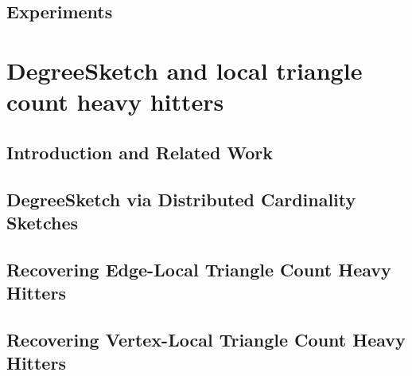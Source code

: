 \documentclass{report}
\begin{document}
\section{Experiments} \label{async:sec:experiments}



\chapter{DegreeSketch and local triangle count heavy hitters}
 \label{chap:DS}


\section{Introduction and Related Work}
 \label{DS:sec:DS}


\section{DegreeSketch via Distributed Cardinality Sketches}
 \label{DS:sec:DS}


\section{Recovering Edge-Local Triangle Count Heavy Hitters}
 \label{DS:sec:edge_triangles}


\section{Recovering Vertex-Local Triangle Count Heavy Hitters}
 \label{DS:sec:vertex_triangles}
\end{document}
